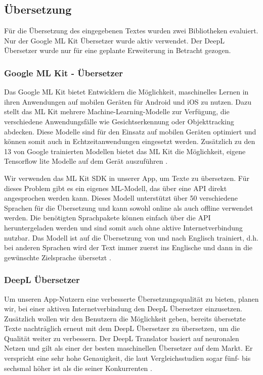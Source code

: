\subsection{Übersetzung}
Für die Übersetzung des eingegebenen Textes wurden zwei Bibliotheken evaluiert. Nur der Google ML Kit Übersetzer wurde aktiv verwendet. Der DeepL Übersetzer wurde nur für eine geplante Erweiterung in Betracht gezogen.

\subsubsection{Google ML Kit - Übersetzer}
Das Google ML Kit bietet Entwicklern die Möglichkeit, maschinelles Lernen in ihren Anwendungen auf mobilen Geräten für Android und iOS zu nutzen. Dazu stellt das ML Kit mehrere Machine-Learning-Modelle zur Verfügung, die verschiedene Anwendungsfälle wie Gesichtserkennung oder Objekttracking abdecken. Diese Modelle sind für den Einsatz auf mobilen Geräten optimiert und können somit auch in Echtzeitanwendungen eingesetzt werden. Zusätzlich zu den 13 von Google trainierten Modellen bietet das ML Kit die Möglichkeit, eigene Tensorflow lite Modelle auf dem Gerät auszuführen \cite{mlKit}.

Wir verwenden das ML Kit SDK in unserer App, um Texte zu übersetzen. Für dieses Problem gibt es ein eigenes ML-Modell, das über eine API direkt angesprochen werden kann. Dieses Modell unterstützt über 50 verschiedene Sprachen für die Übersetzung und kann sowohl online als auch offline verwendet werden. Die benötigten Sprachpakete können einfach über die API heruntergeladen werden und sind somit auch ohne aktive Internetverbindung nutzbar. Das Modell ist auf die Übersetzung von und nach Englisch trainiert, d.h. bei anderen Sprachen wird der Text immer zuerst ins Englische und dann in die gewünschte Zielsprache übersetzt \cite{mlKitTranslation}.


\subsubsection{DeepL Übersetzer}
Um unseren App-Nutzern eine verbesserte Übersetzungsqualität zu bieten, planen wir, bei einer aktiven Internetverbindung den DeepL Übersetzer einzusetzen. Zusätzlich wollen wir den Benutzern die Möglichkeit geben, bereits übersetzte Texte nachträglich erneut mit dem DeepL Übersetzer zu übersetzen, um die Qualität weiter zu verbessern. Der DeepL Translator basiert auf neuronalen Netzen und gilt als einer der besten maschinellen Übersetzer auf dem Markt. Er verspricht eine sehr hohe Genauigkeit, die laut Vergleichsstudien sogar fünf- bis sechsmal höher ist als die seiner Konkurrenten \cite{deepl}.

